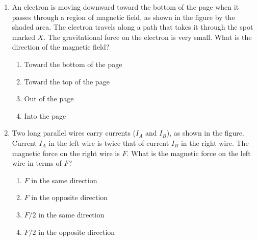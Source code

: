 \documentclass{../../../oss-classkick}
\begin{document}
\genheader


\genmultidirections

\gengravity

\raggedcolumns
\begin{multicols*}{2}

  \begin{enumerate}[leftmargin=18pt]
  \item  An electron is moving downward toward the bottom of the page when
    it passes through a region of magnetic field, as shown in the figure by
    the shaded area. The electron travels along a path that takes it through
    the spot marked $X$. The gravitational force on the electron is very
    small. What is the direction of the magnetic field?
    \begin{center}
    \end{center}
    \begin{enumerate}[nosep,leftmargin=18pt,label=(\Alph*)]
    \item Toward the bottom of the page
    \item Toward the top of the page
    \item Out of the page
    \item Into the page
    \end{enumerate}
    \vspace{.7in}
    
  \item Two long parallel wires carry currents ($I_A$ and $I_B$), as shown in
    the figure. Current $I_A$ in the left wire is twice that of current $I_B$ in
    the right wire. The magnetic force on the right wire is $F$. What is the
    magnetic force on the left wire in terms of $F$?
    \begin{center}
    \end{center}
    \begin{enumerate}[nosep,leftmargin=18pt,label=(\Alph*)]
    \item $F$ in the same direction
    \item $F$ in the opposite direction
    \item $F/2$ in the same direction
    \item $F/2$ in the opposite direction
    \end{enumerate}
    \vspace{.7in}
    

\end{enumerate}
\end{multicols*}
\end{document}
